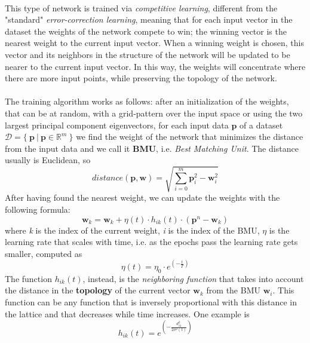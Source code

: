 \paragraph{}
This type of network is trained via \textit{competitive learning}, different from the "standard" \textit{error-correction learning}, meaning that for each input vector in the dataset the weights of the network compete to win; the winning vector is the nearest weight to the current input vector. \newline
When a winning weight is chosen, this vector and its neighbors in the structure of the network will be updated to be nearer to the current input vector. In this way, the weights will concentrate where there are more input points, while preserving the topology of the network.

\paragraph{}
The training algorithm works as follows: after an initialization of the weights, that can be at random, with a grid-pattern over the input space or using the two largest principal component eigenvectors, for each input data $\textbf{p}$ of a dataset $\mathcal{D} = \{\ \textbf{p}\ |\ \textbf{p} \in \mathbb{R}^m\ \}$ we find the weight of the network that minimizes the distance from the input data and we call it \textbf{BMU}, i.e. \textit{Best Matching Unit}. The distance usually is Euclidean, so 
\[
    distance(\textbf{p}, \textbf{w}) = \sqrt{\sum_{i=0}^m \textbf{p}_i^2 - \textbf{w}_i^2}
\] \newline
After having found the nearest weight, we can update the weights with the following formula:
\begin{equation}
    \textbf{w}_k = \textbf{w}_k + \eta(t) \cdot h_{ik}(t) \cdot (\textbf{p}^n - \textbf{w}_k)
\end{equation}
where \textit{k} is the index of the current weight, \textit{i} is the index of the BMU, $\eta$ is the learning rate that scales with time, i.e. as the epochs pass the learning rate gets smaller,  computed as 
\[
    \eta(t) = \eta_0 \cdot e^{\displaystyle \left ( -\frac{t}{T} \right )}
\]
The function $h_{ik}(t)$, instead, is the \textit{neighboring function} that takes into account the distance in the \textbf{topology} of the current vector $\textbf{w}_k$ from the BMU $\textbf{w}_i$. This function can be any function that is inversely proportional with this distance in the lattice and that decreases while time increases. One example is
\begin{equation}
\label{eq:som_neighbor_func}
    h_{ik}(t) = e^{\displaystyle \left ( - \frac{d_{ik}^2}{2\sigma^2(t)} \right ) }
\end{equation}

